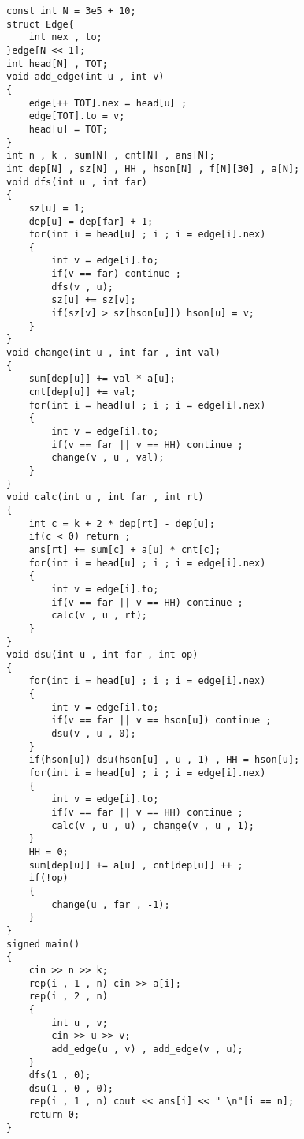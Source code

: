 \documentclass[E:/GsjzTle/main/main.tex]{subfiles}
\begin{document}
\begin{lstlisting}
const int N = 3e5 + 10;
struct Edge{
	int nex , to;
}edge[N << 1];
int head[N] , TOT;
void add_edge(int u , int v)
{
	edge[++ TOT].nex = head[u] ;
	edge[TOT].to = v;
	head[u] = TOT;
}
int n , k , sum[N] , cnt[N] , ans[N];
int dep[N] , sz[N] , HH , hson[N] , f[N][30] , a[N];
void dfs(int u , int far)
{
	sz[u] = 1;
	dep[u] = dep[far] + 1;
	for(int i = head[u] ; i ; i = edge[i].nex)
	{
		int v = edge[i].to;
		if(v == far) continue ;
		dfs(v , u);
		sz[u] += sz[v];
		if(sz[v] > sz[hson[u]]) hson[u] = v;
	}
}
void change(int u , int far , int val)
{
	sum[dep[u]] += val * a[u];
	cnt[dep[u]] += val;
	for(int i = head[u] ; i ; i = edge[i].nex)
	{
		int v = edge[i].to;
		if(v == far || v == HH) continue ;
		change(v , u , val);
	}
} 
void calc(int u , int far , int rt)
{
	int c = k + 2 * dep[rt] - dep[u];
	if(c < 0) return ;
	ans[rt] += sum[c] + a[u] * cnt[c];
	for(int i = head[u] ; i ; i = edge[i].nex)
	{
		int v = edge[i].to;
		if(v == far || v == HH) continue ;
		calc(v , u , rt);
	}
}
void dsu(int u , int far , int op)
{
	for(int i = head[u] ; i ; i = edge[i].nex)
	{
		int v = edge[i].to;
		if(v == far || v == hson[u]) continue ;
		dsu(v , u , 0);
	}
	if(hson[u]) dsu(hson[u] , u , 1) , HH = hson[u];
	for(int i = head[u] ; i ; i = edge[i].nex)
	{
		int v = edge[i].to;
		if(v == far || v == HH) continue ;
		calc(v , u , u) , change(v , u , 1);
	}
	HH = 0;
	sum[dep[u]] += a[u] , cnt[dep[u]] ++ ;
	if(!op) 
	{
		change(u , far , -1);
	}
}
signed main()
{
	cin >> n >> k;
	rep(i , 1 , n) cin >> a[i]; 
	rep(i , 2 , n)
	{
		int u , v;
		cin >> u >> v;
		add_edge(u , v) , add_edge(v , u);
	}
	dfs(1 , 0);
	dsu(1 , 0 , 0);
	rep(i , 1 , n) cout << ans[i] << " \n"[i == n];
	return 0;
}
\end{lstlisting}
\end{document}
